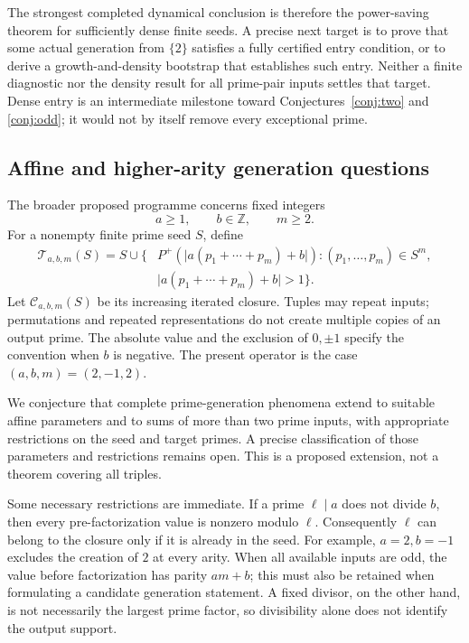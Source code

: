 \documentclass[11pt]{article}
\theoremstyle{definition}
\theoremstyle{remark}
\newcommand{\Cl}{\mathcal C}
\newcommand{\cT}{\mathcal T}
\begin{document}
The strongest completed dynamical conclusion is therefore the
power-saving theorem for sufficiently dense finite seeds.
A precise next target is to prove that some actual generation from
\(\{2\}\) satisfies a fully certified entry condition, or to derive a
growth-and-density bootstrap that establishes such entry. Neither a
finite diagnostic nor the density result for all prime-pair inputs
settles that target. Dense entry is an intermediate milestone toward
Conjectures~\ref{conj:two} and \ref{conj:odd}; it would not by itself
remove every exceptional prime.

\subsection{Affine and higher-arity generation questions}
\label{sec:extensions}

The broader proposed programme concerns fixed integers
\[
 a\ge1,\qquad b\in\mathbb Z,\qquad m\ge2.
\]
For a nonempty finite prime seed \(S\), define
\[
 \begin{aligned}
 \cT_{a,b,m}(S)=S\cup\bigl\{
 &P^{+}(\lvert a(p_1+\cdots+p_m)+b\rvert):
       (p_1,\ldots,p_m)\in S^m,\\
 &\lvert a(p_1+\cdots+p_m)+b\rvert>1
 \bigr\}.
 \end{aligned}
\]
Let \(\Cl_{a,b,m}(S)\) be its increasing iterated closure. Tuples may
repeat inputs; permutations and repeated representations do not create
multiple copies of an output prime. The absolute value and the exclusion
of \(0,\pm1\) specify the convention when \(b\) is negative.
The present operator is the case \((a,b,m)=(2,-1,2)\).

We conjecture that complete prime-generation phenomena extend to suitable
affine parameters and to sums of more than two prime inputs, with
appropriate restrictions on the seed and target primes. A precise
classification of those parameters and restrictions remains open.
This is a proposed extension, not a theorem covering all triples.

Some necessary restrictions are immediate. If a prime \(\ell\mid a\)
does not divide \(b\), then every pre-factorization value is nonzero
modulo \(\ell\). Consequently \(\ell\) can belong to the closure only
if it is already in the seed. For example, \(a=2,b=-1\) excludes the
creation of \(2\) at every arity. When all available inputs are odd,
the value before factorization has parity \(am+b\); this must also
be retained when formulating a candidate generation statement.
A fixed divisor, on the other hand, is not necessarily the largest
prime factor, so divisibility alone does not identify the output support.
\end{document}
